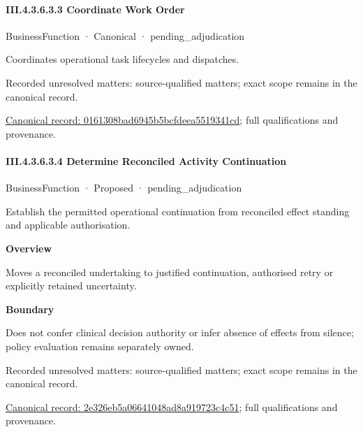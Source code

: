 \paragraph*{III.4.3.6.3.3 Coordinate Work Order}
\label{navigation:III.4.3.6.3.3}

\label{element:0161308bad6945b5bcfdeea5519341cd}
{\small BusinessFunction · Canonical · pending\_adjudication}\par

Coordinates operational task lifecycles and dispatches.


{\small Recorded unresolved matters: source-qualified matters; exact scope remains in the canonical record.}\par
{\footnotesize \href{../../../../../../../../continuum/business/business-function/0161308bad6945b5bcfdeea5519341cd.md}{Canonical record: 0161308bad6945b5bcfdeea5519341cd}; full qualifications and provenance.}\par
\paragraph*{III.4.3.6.3.4 Determine Reconciled Activity Continuation}
\label{navigation:III.4.3.6.3.4}

\label{element:2e326eb5a06641048ad8a919723c4c51}
{\small BusinessFunction · Proposed · pending\_adjudication}\par

Establish the permitted operational continuation from reconciled effect standing and applicable authorisation.



\textbf{Overview}



Moves a reconciled undertaking to justified continuation, authorised retry or explicitly retained uncertainty.



\textbf{Boundary}



Does not confer clinical decision authority or infer absence of effects from silence; policy evaluation remains separately owned.


{\small Recorded unresolved matters: source-qualified matters; exact scope remains in the canonical record.}\par
{\footnotesize \href{../../../../../../../../continuum/business/business-function/2e326eb5a06641048ad8a919723c4c51.md}{Canonical record: 2e326eb5a06641048ad8a919723c4c51}; full qualifications and provenance.}\par
